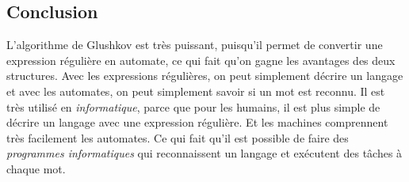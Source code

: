 \subsection{Conclusion}

L’algorithme de Glushkov est très puissant, puisqu’il permet de convertir une
expression régulière en automate, ce qui fait qu’on gagne les avantages des
deux structures. Avec les expressions régulières, on peut simplement décrire un
langage et avec les automates, on peut simplement savoir si un mot est reconnu.
Il est très utilisé en \textit{informatique}, parce que pour les humains, il
est plus simple de décrire un langage avec une expression régulière. Et les
machines comprennent très facilement les automates. Ce qui fait qu’il est
possible de faire des \textit{programmes informatiques} qui reconnaissent un
langage et exécutent des tâches à chaque mot.
